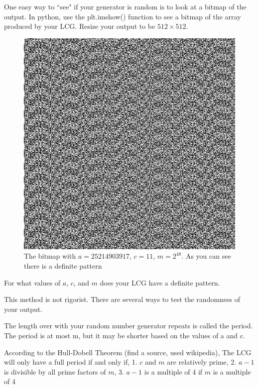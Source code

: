 One easy way to ``see" if your generator is random is to look at a bitmap of the output. In python, use the plt.imshow() function to see a bitmap of the array produced by your LCG. Resize your output to be $512 \times 512$. 

\begin{figure}[H]
\includegraphics[scale = .4]{PRNG1.jpg}
\caption{The bitmap with $a=25214903917$, $c=11$, $m=2^{48}$. As you can see there is a definite pattern}
\end{figure}

\begin{problem}
For what values of $a$, $c$, and $m$ does your LCG have a definite pattern.
\end{problem}

This method is not rigorist. There are several ways to test the randomness of your output. 

The length over with your random number generator repeats is called the period. The period is at most m, but it may be shorter based on the values of a and c.
 
According to the Hull-Dobell Theorem (find a source, used wikipedia), The LCG will only have a full period if and only if, 
1. $c$ and $m$ are relatively prime,
2. $a-1$ is divisible by all prime factors of $m$,
3. $a-1$ is a multiple of 4 if $m$ is a multiple of 4

